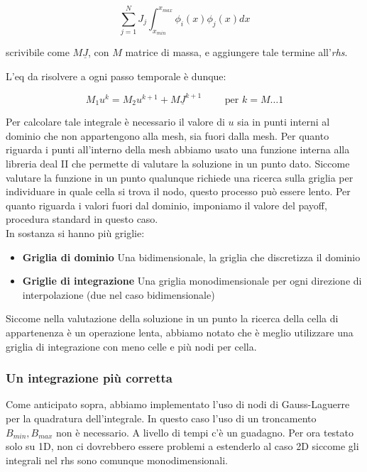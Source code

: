 \documentclass[a4paper,10pt]{article}
\begin{document}
\begin{equation*}
 \sum_{j=1}^N J_j\int_{x_{min}}^{x_{max}} \phi_i(x)\phi_j(x)dx
\end{equation*}

scrivibile come $M\underline{J}$, con $M$ matrice di massa, e aggiungere tale termine all'\emph{rhs}.

L'eq da risolvere a ogni passo temporale è dunque:

\begin{equation*}
 M_1u^k=M_2u^{k+1}+M\underline{J}^{k+1}  \qquad \text{ per } k=M\dots1
\end{equation*}


Per calcolare tale integrale è necessario il valore di $u$ sia in punti interni al dominio che non appartengono alla mesh, sia fuori dalla mesh. Per quanto riguarda i punti all'interno della mesh abbiamo usato una funzione interna alla libreria deal II che permette di valutare la soluzione in un punto dato. Siccome valutare la funzione in un punto qualunque richiede una ricerca sulla griglia per individuare in quale cella si trova il nodo, questo processo può essere lento. Per quanto riguarda i valori fuori dal dominio, imponiamo il valore del payoff, procedura standard in questo caso.\\

In sostanza si hanno più griglie:
\begin{itemize}
 \item \textbf{Griglia di dominio} Una bidimensionale, la griglia che discretizza il dominio
 \item \textbf{Griglie di integrazione} Una griglia monodimensionale per ogni direzione di interpolazione (due nel caso bidimensionale)
\end{itemize}

Siccome nella valutazione della soluzione in un punto la ricerca della cella di appartenenza è un operazione lenta, abbiamo notato che è meglio utilizzare una griglia di integrazione con meno celle e più nodi per cella.

\subsubsection{Un integrazione più corretta}
Come anticipato sopra, abbiamo implementato l'uso di nodi di Gauss-Laguerre per la quadratura dell'integrale. In questo caso l'uso di un troncamento $B_{min},B_{max}$ non è necessario. A livello di tempi c'è un guadagno. Per ora testato solo su 1D, non ci dovrebbero essere problemi a estenderlo al caso 2D siccome gli integrali nel rhs sono comunque monodimensionali.
\end{document}
